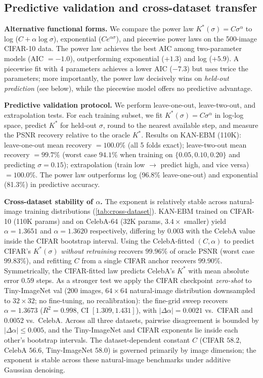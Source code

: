 \documentclass{article}
\begin{document}
\subsection{Predictive validation and cross-dataset transfer}
\label{sec:predictive}
\textbf{Alternative functional forms.} We compare the power law $K^*(\sigma) = C\sigma^\alpha$ to log ($C + \alpha\log\sigma$), exponential ($C e^{\alpha\sigma}$), and piecewise power laws on the 500-image CIFAR-10 data. The power law achieves the best AIC among two-parameter models (AIC $= -1.0$), outperforming exponential ($+1.3$) and log ($+5.9$). A piecewise fit with 4 parameters achieves a lower AIC ($-7.3$) but uses twice the parameters; more importantly, the power law decisively wins on \emph{held-out prediction} (see below), while the piecewise model offers no predictive advantage.

\textbf{Predictive validation protocol.} We perform leave-one-out, leave-two-out, and extrapolation tests. For each training subset, we fit $K^*(\sigma) = C\sigma^\alpha$ in log-log space, predict $K^*$ for held-out $\sigma$, round to the nearest available step, and measure the PSNR recovery relative to the oracle $K^*$. Results on KAN-EBM (110K): leave-one-out mean recovery $= 100.0\%$ (all 5 folds exact); leave-two-out mean recovery $= 99.7\%$ (worst case $94.1\%$ when training on $\{0.05,0.10,0.20\}$ and predicting $\sigma=0.15$); extrapolation (train low $\rightarrow$ predict high, and vice versa) $= 100.0\%$. The power law outperforms log (96.8\% leave-one-out) and exponential (81.3\%) in predictive accuracy.

\textbf{Cross-dataset stability of $\alpha$.} The exponent is relatively stable across natural-image training distributions (\cref{tab:cross-dataset}). KAN-EBM trained on CIFAR-10 (110K params) and on CelebA-64 (32K params, $3.4{\times}$ smaller) yield $\alpha = 1.3651$ and $\alpha = 1.3620$ respectively, differing by $0.003$ with the CelebA value inside the CIFAR bootstrap interval. Using the CelebA-fitted $(C, \alpha)$ to predict CIFAR's $K^*(\sigma)$ \emph{without retraining} recovers $99.96\%$ of oracle PSNR (worst case $99.83\%$), and refitting $C$ from a single CIFAR anchor recovers $99.90\%$. Symmetrically, the CIFAR-fitted law predicts CelebA's $K^*$ with mean absolute error $0.59$ steps. As a stronger test we apply the CIFAR checkpoint \emph{zero-shot} to Tiny-ImageNet val ($200$ images, $64{\times}64$ natural-image distribution downsampled to $32{\times}32$; no fine-tuning, no recalibration): the fine-grid sweep recovers $\alpha = 1.3673$ ($R^2{=}0.998$, CI $[1.309, 1.431]$), with $|\Delta\alpha| = 0.0021$ vs.~CIFAR and $0.0052$ vs.~CelebA. Across all three datasets, pairwise disagreement is bounded by $|\Delta\alpha|{\leq}0.005$, and the Tiny-ImageNet and CIFAR exponents lie inside each other's bootstrap intervals. The dataset-dependent constant $C$ (CIFAR $58.2$, CelebA $56.6$, Tiny-ImageNet $58.0$) is governed primarily by image dimension; the exponent is stable across these natural-image benchmarks under additive Gaussian denoising.
\end{document}
